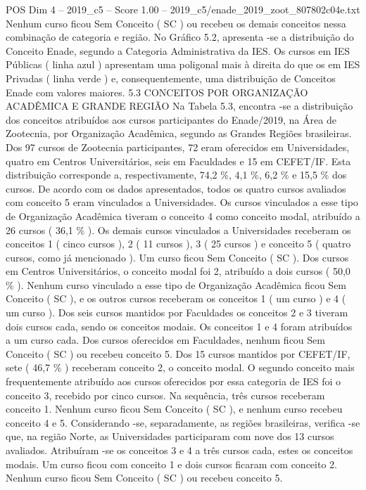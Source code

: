 \begin{textsample}{POS Dim 4 – 2019\_c5 – Score 1.00 – 2019\_c5/enade\_2019\_zoot\_807802c04e.txt}
Nenhum curso ficou Sem Conceito ( SC ) ou recebeu os demais conceitos nessa combinação de categoria e região.
No Gráfico 5.2, apresenta -se a distribuição do Conceito Enade, segundo a Categoria Administrativa da IES.
Os cursos em IES Públicas ( linha azul ) apresentam uma poligonal mais à direita do que os em IES Privadas ( linha verde ) e, consequentemente, uma distribuição de Conceitos Enade com valores maiores. 5.3 CONCEITOS POR ORGANIZAÇÃO ACADÊMICA E GRANDE REGIÃO Na Tabela 5.3, encontra -se a distribuição dos conceitos atribuídos aos cursos participantes do Enade/2019, na Área de Zootecnia, por Organização Acadêmica, segundo as Grandes Regiões brasileiras.
Dos 97 cursos de Zootecnia participantes, 72 eram oferecidos em Universidades, quatro em Centros Universitários, seis em Faculdades e 15 em CEFET/IF.
Esta distribuição corresponde a, respectivamente, 74,2 \%, 4,1 \%, 6,2 \% e 15,5 \% dos cursos.
De acordo com os dados apresentados, todos os quatro cursos avaliados com conceito 5 eram vinculados a Universidades.
Os cursos vinculados a esse tipo de Organização Acadêmica tiveram o conceito 4 como conceito modal, atribuído a 26 cursos ( 36,1 \% ).
Os demais cursos vinculados a Universidades receberam os conceitos 1 ( cinco cursos ), 2 ( 11 cursos ), 3 ( 25 cursos ) e conceito 5 ( quatro cursos, como já mencionado ).
Um curso ficou Sem Conceito ( SC ).
Dos cursos em Centros Universitários, o conceito modal foi 2, atribuído a dois cursos ( 50,0 \% ).
Nenhum curso vinculado a esse tipo de Organização Acadêmica ficou Sem Conceito ( SC ), e os outros cursos receberam os conceitos 1 ( um curso ) e 4 ( um curso ).
Dos seis cursos mantidos por Faculdades os conceitos 2 e 3 tiveram dois cursos cada, sendo os conceitos modais.
Os conceitos 1 e 4 foram atribuídos a um curso cada.
Dos cursos oferecidos em Faculdades, nenhum ficou Sem Conceito ( SC ) ou recebeu conceito 5.
Dos 15 cursos mantidos por CEFET/IF, sete ( 46,7 \% ) receberam conceito 2, o conceito modal.
O segundo conceito mais frequentemente atribuído aos cursos oferecidos por essa categoria de IES foi o conceito 3, recebido por cinco cursos.
Na sequência, três cursos receberam conceito 1.
Nenhum curso ficou Sem Conceito ( SC ), e nenhum curso recebeu conceito 4 e 5.
Considerando -se, separadamente, as regiões brasileiras, verifica -se que, na região Norte, as Universidades participaram com nove dos 13 cursos avaliados.
Atribuíram -se os conceitos 3 e 4 a três cursos cada, estes os conceitos modais.
Um curso ficou com conceito 1 e dois cursos ficaram com conceito 2.
Nenhum curso ficou Sem Conceito ( SC ) ou recebeu conceito 5.

\end{textsample}
